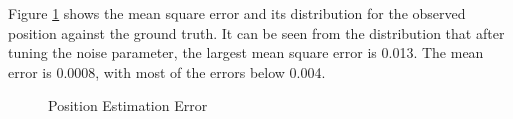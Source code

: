 \documentclass[letter, 10pt]{article}
\begin{document}
\begin{onehalfspacing}
Figure \ref{MSE} shows the mean square error and its distribution for the observed position against the ground truth. It can be seen from the distribution that after tuning the noise parameter, the largest mean square error is 0.013. The mean error is 0.0008, with most of the errors below 0.004.

\begin{figure}[t!]
	\centering
	\quad
	\caption{Position Estimation Error}
	\label{MSE}	
\end{figure}


\end{onehalfspacing}
\end{document}
